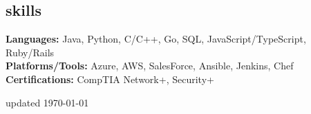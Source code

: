 \documentclass[margin,10pt]{res}
\begin{document}
\begin{resume}
\section{\sc \lsstyle skills}
    \textbf{Languages:}
    Java, Python, C/C++, Go, SQL, JavaScript/TypeScript, Ruby/Rails  \\
    \textbf{Platforms/Tools:} Azure, AWS, SalesForce, Ansible, Jenkins, Chef\\
    \textbf{Certifications:} CompTIA Network+, Security+\\
\end{resume}
\begin{minipage}[t]{\textwidth}
    \flushright
    \small
    \sc \lsstyle
    \hfill updated \today
\end{minipage}
\end{document}
